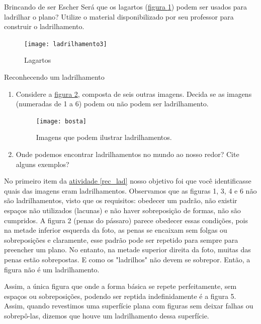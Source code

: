 \begin{task}{Brincando de ser Escher} \label{at_brinc}
Será que os lagartos (\hyperref[lizard]{figura \ref{lizard}}) podem ser usados para ladrilhar o plano? 
Utilize o material disponibilizado por seu professor para construir o ladrilhamento.


\begin{figure}[H]
\centering
\texttt{[image: ladrilhamento3]}
\caption{Lagartos}
\label{lizard}
\end{figure}
\end{task}


\begin{task}{Reconhecendo um ladrilhamento} \label{rec_lad}
\begin{enumerate}
\item Considere  a \hyperref[ladr12]{figura \ref{ladr12}}, composta de seis outras imagens. Decida se as imagens (numeradas de 1 a 6) podem ou não podem ser  ladrilhamento.

\begin{figure}[H]
\centering
\texttt{[image: bosta]}
\caption{Imagens que podem ilustrar ladrilhamentos.}
\label{ladr12}
\end{figure}

\item Onde podemos encontrar ladrilhamentos no mundo ao nosso redor? Cite alguns exemplos?

\end{enumerate}

\end{task}




No primeiro item da \hyperref[rec_lad]{atividade \ref{rec_lad}} nosso objetivo foi que você identificasse  quais das imagens eram ladrilhamentos.
Observamos que as figuras 1, 3, 4 e 6 não são ladrilhamentos, visto que os requisitos:  obedecer um padrão, não existir espaços não utilizados (lacunas) e não haver sobreposição de formas, não são cumpridos. A figura 2 (penas do pássaro) parece obedecer essas condições, pois na metade inferior esquerda da foto, as penas se encaixam sem folgas ou sobreposições e claramente, esse padrão pode ser repetido para sempre para preencher um plano. No entanto, na metade superior direita da foto, muitas das penas estão sobrepostas. E como os "ladrilhos" não devem se sobrepor. Então, a figura não é um ladrilhamento.

Assim, a única figura que onde a forma básica se repete perfeitamente, sem espaços ou sobreposições, podendo ser reptida indefinidamente é a figura 5.
Assim,  quando revestimos uma superfície plana com figuras sem deixar falhas ou sobrepô-las, dizemos que houve um ladrilhamento dessa superfície. 

